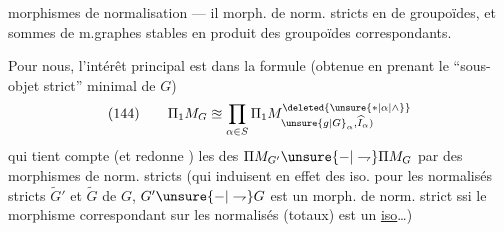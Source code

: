 morphismes de normalisation — il  morph. de norm. stricts en  de groupoïdes, et sommes de m.graphes stables en produit des groupoïdes correspondants.

Pour nous, l'intérêt principal est dans la formule (obtenue en prenant le ``sous-objet strict'' minimal de $G$)
\[
(144)\qquad \Pi_1M_G\approxeq\prod_{\alpha\in S}\Pi_1M_{\unsure{g|G}_\alpha,\widehat I_\alpha)}^{\deleted{\unsure{*|\alpha|\wedge}}}
\]
qui tient compte  (et redonne ) les  des $\Pi M_{G'}\unsure{-|\rightharpoondown}\Pi M_G$ par des morphismes de norm. stricts (qui induisent en effet des iso. pour les normalisés stricts $\widetilde G'$ et $\widetilde G$ de $G$,
$G'\unsure{-|\rightharpoondown}G$ est un morph. de norm. strict ssi le morphisme correspondant sur les normalisés (totaux) est un \uline{iso}\ldots)
